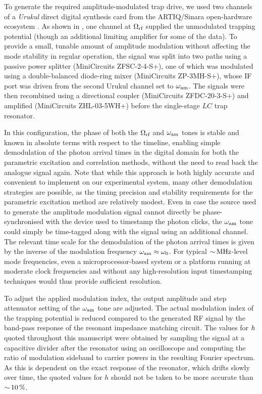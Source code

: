 \documentclass[pra,twocolumn]{revtex4-2}
\begin{document}
To generate the required amplitude-modulated trap \RF{} drive, we used two channels of a \emph{Urukul} direct digital synthesis card from the ARTIQ/Sinara open-hardware ecosystem \cite{ARTIQ}.
As shown in , one channel at $\Omega_{\textrm{rf}}$ supplied the unmodulated trapping potential (though an additional limiting amplifier for some of the data).
To provide a small, tunable amount of amplitude modulation without affecting the mode stability in regular operation, the signal was split into two paths using a passive power splitter (MiniCircuits ZFSC-2-4-S+), one of which was modulated using a double-balanced diode-ring mixer (MiniCircuits ZP-3MH-S+), whose IF port was driven from the second Urukul channel set to $\omega_{\textrm{am}}$.
The signals were then recombined using a directional coupler (MiniCircuits ZFDC-20-3-S+) and amplified (MiniCircuits ZHL-03-5WH+) before the single-stage $LC$ trap resonator.

In this configuration, the phase of both the $\Omega_{\textrm{rf}}$ and $\omega_{\textrm{am}}$ tones is stable and known in absolute terms with respect to the \FPGA{} timeline, enabling simple demodulation of the photon arrival times in the digital domain for both the parametric excitation and \RF{} correlation methods, without the need to read back the analogue signal again.
Note that while this approach is both highly accurate and convenient to implement on our experimental system, many other demodulation strategies are possible, as the timing precision and stability requirements for the parametric excitation method are relatively modest.
Even in case the source used to generate the amplitude modulation signal cannot directly be phase-synchronised with the device used to timestamp the photon clicks, the $\omega_{\textrm{am}}$ tone could simply be time-tagged along with the signal using an additional channel.
The relevant time scale for the demodulation of the photon arrival times is given by the inverse of the modulation frequency $\omega_{\textrm{am}} \approx \omega_{\textrm{0}}$.
For typical  $\mbox{$\sim$}\, \si{\mega\hertz}$-level mode frequencies, even a microprocessor-based system or a \FPGA{} platform running at moderate clock frequencies and without any high-resolution input timestamping techniques would thus provide sufficient resolution.

To adjust the applied modulation index, the output amplitude and step attenuator setting of the $\omega_{\textrm{am}}$ tone are adjusted.
The actual modulation index of the trapping potential is reduced compared to the generated RF signal by the band-pass response of the resonant impedance matching circuit.
The values for $h$ quoted throughout this manuscript were obtained by sampling the signal at a capacitive divider after the resonator using an oscilloscope and computing the ratio of modulation sideband to carrier powers in the resulting Fourier spectrum.
As this is dependent on the exact response of the resonator, which drifts slowly over time, the quoted values for $h$ should not be taken to be more accurate than $\mbox{$\sim$}\,\SI{10}{\percent}$.
\end{document}
